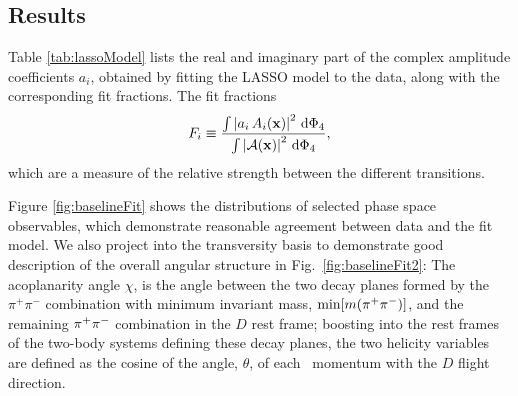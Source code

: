 \clearpage
\subsection{Results}

Table \ref{tab:lassoModel} 
lists the real and imaginary part of the complex amplitude coefficients $a_{i}$, 
obtained by fitting the LASSO model to the data,
along with the corresponding fit fractions. 
The fit fractions
\begin{equation}
\label{eq:DefineFitFractions}
	F_{i} \equiv \frac{\int \left\vert   a_{i} \, A_{i}(\mathbf{x}) \right\vert^{2} \, \text{d}\Phi_{4} }
	{\int \left\vert  \mathcal A(\mathbf{x}) \right\vert^{2} \, \text{d}\Phi_{4}}, 
\end{equation}
which are a measure of the relative strength between the different transitions. 

Figure \ref{fig:baselineFit} shows the distributions of 
selected phase space observables, which demonstrate 
reasonable agreement between data and the fit model. 
We also project into the transversity basis to demonstrate good description of the overall angular structure in
Fig.~\ref{fig:baselineFit2}: 
The acoplanarity angle 
${\chi}$, is the angle between the two decay planes formed by 
the $\pi^+\pi^-$ combination with minimum invariant mass, ${\rm min}[m(\pi^+\pi^-)]$,  
and the remaining ${{\pi}^+} {{\pi}^-}$ combination
in the $D$ rest frame; boosting into the rest frames of the two-body systems defining these decay planes,
the two helicity variables 
are defined as the cosine of the angle, ${\theta}$, 
of each \pip\ momentum with the $D$ flight direction.


